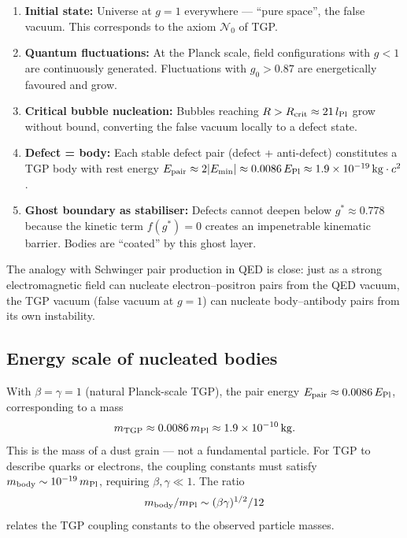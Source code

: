 \begin{enumerate}
\item \textbf{Initial state:} Universe at $g=1$ everywhere —
  ``pure space'', the false vacuum.  This corresponds to the axiom
  $\mathcal{N}_0$ of TGP.

\item \textbf{Quantum fluctuations:} At the Planck scale, field
  configurations with $g<1$ are continuously generated.  Fluctuations
  with $g_0>0.87$ are energetically favoured and grow.

\item \textbf{Critical bubble nucleation:} Bubbles reaching
  $R>R_{\rm crit}\approx21\,l_{\rm Pl}$ grow without bound,
  converting the false vacuum locally to a defect state.

\item \textbf{Defect = body:} Each stable defect pair (defect +
  anti-defect) constitutes a TGP body with rest energy
  $E_{\rm pair}\approx 2|E_{\rm min}|\approx 0.0086\,E_{\rm Pl}
  \approx 1.9\times10^{-19}\,{\rm kg}\cdot c^2$.

\item \textbf{Ghost boundary as stabiliser:} Defects cannot deepen
  below $g^*\approx0.778$ because the kinetic term $f(g^*)=0$
  creates an impenetrable kinematic barrier.  Bodies are
  ``coated'' by this ghost layer.
\end{enumerate}

\noindent
The analogy with Schwinger pair production in QED is close: just as
a strong electromagnetic field can nucleate electron--positron pairs
from the QED vacuum, the TGP vacuum (false vacuum at $g=1$) can
nucleate body--antibody pairs from its own instability.

\subsection{Energy scale of nucleated bodies}

With $\beta=\gamma=1$ (natural Planck-scale TGP), the pair energy
$E_{\rm pair}\approx 0.0086\,E_{\rm Pl}$, corresponding to a mass
\begin{equation}
  m_{\rm TGP} \approx 0.0086\,m_{\rm Pl} \approx 1.9\times10^{-10}\,{\rm kg}.
\end{equation}
This is the mass of a dust grain — not a fundamental particle.  For
TGP to describe quarks or electrons, the coupling constants must
satisfy $m_{\rm body}\sim 10^{-19}\,m_{\rm Pl}$, requiring
$\beta,\gamma\ll1$.  The ratio
\begin{equation}
  m_{\rm body}/m_{\rm Pl} \sim (\beta\gamma)^{1/2}/12
\end{equation}
relates the TGP coupling constants to the observed particle masses.


